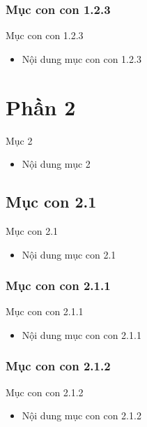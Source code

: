\documentclass{beamer}
\begin{document}
\subsubsection{Mục con con 1.2.3}
\begin{frame}{Mục con con 1.2.3}
\begin{itemize}
\item Nội dung mục con con 1.2.3
\end{itemize}
\end{frame}

\section{Phần 2}
\begin{frame}{Mục 2}
\begin{itemize}
\item Nội dung mục 2
\end{itemize}
\end{frame}

\subsection{Mục con 2.1}
\begin{frame}{Mục con 2.1}
\begin{itemize}
\item Nội dung mục con 2.1
\end{itemize}
\end{frame}

\subsubsection{Mục con con 2.1.1}
\begin{frame}{Mục con con 2.1.1}
\begin{itemize}
\item Nội dung mục con con 2.1.1
\end{itemize}
\end{frame}

\subsubsection{Mục con con 2.1.2}
\begin{frame}{Mục con con 2.1.2}
\begin{itemize}
\item Nội dung mục con con 2.1.2
\end{itemize}
\end{frame}
\end{document}
